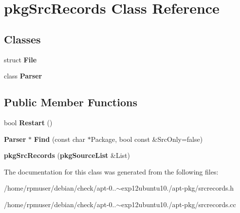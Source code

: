 \section{pkg\-Src\-Records \-Class \-Reference}
\label{classpkgSrcRecords}
\subsection*{\-Classes}
\begin{DoxyCompactItemize}
\item 
struct {\bf \-File}
\item 
class {\bf \-Parser}
\end{DoxyCompactItemize}
\subsection*{\-Public \-Member \-Functions}
\begin{DoxyCompactItemize}
\item 
bool {\bfseries \-Restart} ()\label{classpkgSrcRecords_a8a3b1b849fee6ca925d8eae8534007c7}

\item 
{\bf \-Parser} $\ast$ {\bfseries \-Find} (const char $\ast$\-Package, bool const \&\-Src\-Only=false)\label{classpkgSrcRecords_a963f3b87c05be6cf5ffe43f63b9de08f}

\item 
{\bfseries pkg\-Src\-Records} ({\bf pkg\-Source\-List} \&\-List)\label{classpkgSrcRecords_a503d94cd18bb8226bad374c8f22a9262}

\end{DoxyCompactItemize}


\-The documentation for this class was generated from the following files\-:\begin{DoxyCompactItemize}
\item 
/home/rpmuser/debian/check/apt-\/0..$\sim$exp12ubuntu10./apt-\/pkg/srcrecords.\-h\item 
/home/rpmuser/debian/check/apt-\/0..$\sim$exp12ubuntu10./apt-\/pkg/srcrecords.\-cc\end{DoxyCompactItemize}
